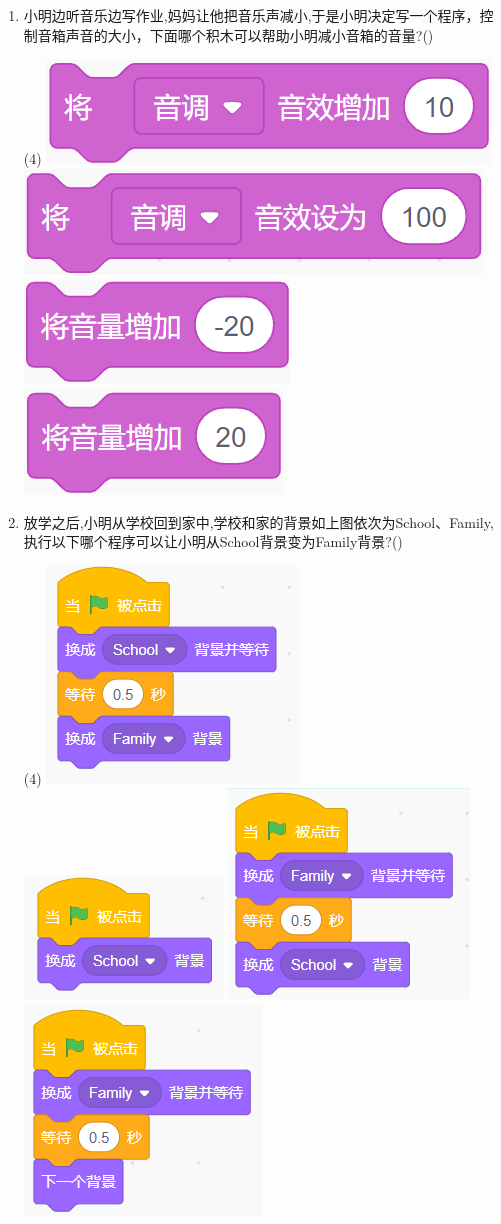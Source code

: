 \documentclass[10pt, a4paper]{article}
\begin{document}
\begin{enumerate}
        \newpage
        \item 小明边听音乐边写作业,妈妈让他把音乐声减小,于是小明决定写一个程序，控制音箱声音的大小，下面哪个积木可以帮助小明减小音箱的音量?(\qquad)
        \begin{tasks}(4)
            \task \includegraphics[width=.18\textwidth]{7a.png}
            \task \includegraphics[width=.18\textwidth]{7b.png}
            \task \includegraphics[width=.12\textwidth]{7c.png}
            \task \includegraphics[width=.12\textwidth]{7d.png}
        \end{tasks}
           
        \item 放学之后,小明从学校回到家中,学校和家的背景如上图依次为School、Family,执行以下哪个程序可以让小明从School背景变为Family背景?(\qquad)
        \begin{tasks}(4)
            \task \includegraphics[width=.15\textwidth]{8a.png}
            \task \includegraphics[width=.15\textwidth]{8b.png}
            \task \includegraphics[width=.15\textwidth]{8c.png}
            \task \includegraphics[width=.15\textwidth]{8d.png}
        \end{tasks}


\end{enumerate}
\end{document}
